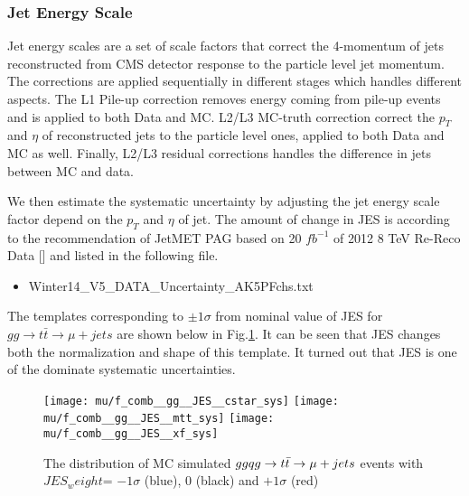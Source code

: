 \documentclass{cmspaperpdf}
\begin{document}
\subsubsection{Jet Energy Scale}
Jet energy scales are a set of scale factors that correct the 4-momentum of jets reconstructed from CMS detector response to the particle level jet momentum. The corrections are applied sequentially in different stages which handles different aspects. The L1 Pile-up correction removes energy coming from pile-up events and is applied to both Data and MC. L2/L3 MC-truth correction correct the $p_T$ and $\eta$ of reconstructed jets to the particle level ones, applied to both Data and MC as well. Finally, L2/L3 residual corrections handles the difference in jets between MC and data.  

We then estimate the systematic uncertainty by adjusting the jet energy scale factor depend on the $p_T$ and $\eta$ of jet. The amount of change in JES is according to the recommendation of JetMET PAG based on 20 $fb^{-1}$ of 2012 8 TeV Re-Reco Data [] and listed in the following file.
\begin{itemize}
\item Winter14\_V5\_DATA\_Uncertainty\_AK5PFchs.txt
\end{itemize}

The templates corresponding to $\pm 1\sigma$ from nominal value of JES for $gg\rightarrow t\bar{t}\rightarrow \mu+jets$ are shown below in Fig.\ref{fig:gg_JES_templates}. It can be seen that JES changes both the normalization and shape of this template. It turned out that JES is one of the dominate systematic uncertainties.

\begin{figure}[hbt]
  \begin{center}
    \texttt{[image: mu/f\_comb\_\_gg\_\_JES\_\_cstar\_sys]}
    \texttt{[image: mu/f\_comb\_\_gg\_\_JES\_\_mtt\_sys]}
    \texttt{[image: mu/f\_comb\_\_gg\_\_JES\_\_xf\_sys]}

  \caption{\small The distribution of MC simulated $gg\/qg\rightarrow t\bar{t}\rightarrow \mu+jets$ events with $JES_weight$= $-1\sigma$ (blue), 0 (black) and $+1\sigma$ (red)}
    \label{fig:gg_JES_templates}
  \end{center}
\end{figure}
\end{document}

